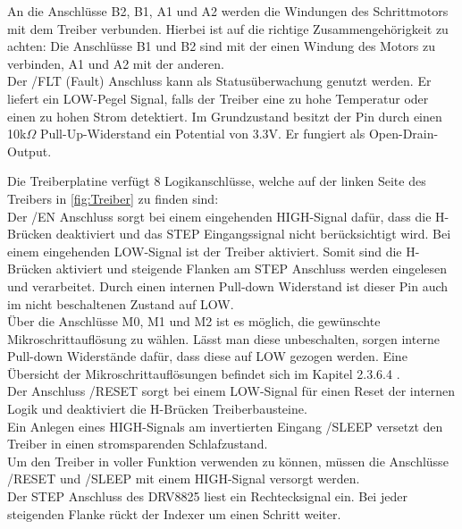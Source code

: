 An die Anschlüsse B2, B1, A1 und A2 werden die Windungen des Schrittmotors mit dem Treiber verbunden.
Hierbei ist auf die richtige Zusammengehörigkeit zu achten:
Die Anschlüsse B1 und B2 sind mit der einen Windung des Motors zu verbinden, A1 und A2 mit der anderen. \\

Der /FLT (Fault)  Anschluss kann als Statusüberwachung genutzt werden.
Er liefert ein LOW-Pegel Signal, falls der Treiber eine zu hohe Temperatur oder einen zu hohen Strom detektiert.
Im Grundzustand besitzt der Pin durch einen 10k$\Omega$ Pull-Up-Widerstand ein Potential von 3.3V.
Er fungiert als Open-Drain-Output.

\newpage
Die Treiberplatine verfügt 8 Logikanschlüsse, welche auf der linken Seite des Treibers in \autoref{fig:Treiber} zu finden sind: \\

Der /EN Anschluss sorgt bei einem eingehenden HIGH-Signal dafür, dass die H-Brücken deaktiviert und das STEP Eingangssignal nicht berücksichtigt wird.
Bei einem eingehenden LOW-Signal ist der Treiber aktiviert.
Somit sind die H-Brücken aktiviert und steigende Flanken am STEP Anschluss werden eingelesen und verarbeitet.
Durch einen internen Pull-down Widerstand ist dieser Pin auch im nicht beschaltenen Zustand auf LOW. \\

Über die Anschlüsse M0, M1 und M2 ist es möglich, die gewünschte Mikroschrittauflösung zu wählen.
Lässt man diese unbeschalten, sorgen interne Pull-down Widerstände dafür, dass diese auf LOW gezogen werden.
Eine Übersicht der Mikroschrittauflösungen befindet sich im Kapitel 2.3.6.4 . \\

Der Anschluss /RESET sorgt bei einem LOW-Signal für einen Reset der internen Logik und deaktiviert die H-Brücken Treiberbausteine. \\

Ein Anlegen eines HIGH-Signals am invertierten Eingang /SLEEP versetzt den Treiber in einen stromsparenden Schlafzustand. \\

Um den Treiber in voller Funktion verwenden zu können, müssen die Anschlüsse /RESET und /SLEEP mit einem HIGH-Signal versorgt werden. \\

Der STEP Anschluss des DRV8825 liest ein Rechtecksignal ein.
Bei jeder steigenden Flanke rückt der Indexer um einen Schritt weiter. \\

